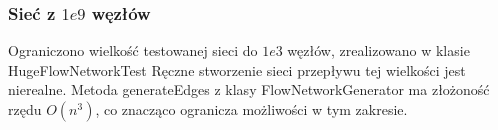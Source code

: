 \subsubsection{Sieć z $1e9$ węzłów}
Ograniczono wielkość testowanej sieci do $1e3$ węzłów, zrealizowano w klasie
HugeFlowNetworkTest Ręczne stworzenie sieci przepływu tej wielkości jest
nierealne. Metoda generateEdges z klasy FlowNetworkGenerator ma złożoność
rzędu $O(n^3)$, co znacząco ogranicza możliwości w tym zakresie.
